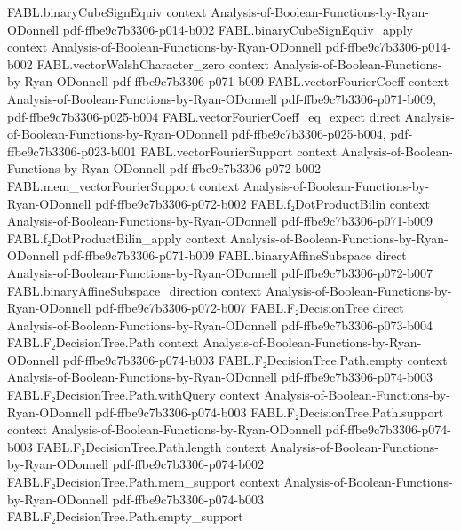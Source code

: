 \begin{theorem}
\proofstep
  {FABL.binaryCubeSignEquiv}
  {context}
  {Analysis-of-Boolean-Functions-by-Ryan-ODonnell}
  {pdf-ffbe9c7b3306-p014-b002}
\proofstep
  {FABL.binaryCubeSignEquiv_apply}
  {context}
  {Analysis-of-Boolean-Functions-by-Ryan-ODonnell}
  {pdf-ffbe9c7b3306-p014-b002}
\proofstep
  {FABL.vectorWalshCharacter_zero}
  {context}
  {Analysis-of-Boolean-Functions-by-Ryan-ODonnell}
  {pdf-ffbe9c7b3306-p071-b009}
\proofstep
  {FABL.vectorFourierCoeff}
  {context}
  {Analysis-of-Boolean-Functions-by-Ryan-ODonnell}
  {pdf-ffbe9c7b3306-p071-b009,
    pdf-ffbe9c7b3306-p025-b004}
\proofstep
  {FABL.vectorFourierCoeff_eq_expect}
  {direct}
  {Analysis-of-Boolean-Functions-by-Ryan-ODonnell}
  {pdf-ffbe9c7b3306-p025-b004,
    pdf-ffbe9c7b3306-p023-b001}
\proofstep
  {FABL.vectorFourierSupport}
  {context}
  {Analysis-of-Boolean-Functions-by-Ryan-ODonnell}
  {pdf-ffbe9c7b3306-p072-b002}
\proofstep
  {FABL.mem_vectorFourierSupport}
  {context}
  {Analysis-of-Boolean-Functions-by-Ryan-ODonnell}
  {pdf-ffbe9c7b3306-p072-b002}
\proofstep
  {FABL.f₂DotProductBilin}
  {context}
  {Analysis-of-Boolean-Functions-by-Ryan-ODonnell}
  {pdf-ffbe9c7b3306-p071-b009}
\proofstep
  {FABL.f₂DotProductBilin_apply}
  {context}
  {Analysis-of-Boolean-Functions-by-Ryan-ODonnell}
  {pdf-ffbe9c7b3306-p071-b009}
\proofstep
  {FABL.binaryAffineSubspace}
  {direct}
  {Analysis-of-Boolean-Functions-by-Ryan-ODonnell}
  {pdf-ffbe9c7b3306-p072-b007}
\proofstep
  {FABL.binaryAffineSubspace_direction}
  {context}
  {Analysis-of-Boolean-Functions-by-Ryan-ODonnell}
  {pdf-ffbe9c7b3306-p072-b007}
\proofstep
  {FABL.F₂DecisionTree}
  {direct}
  {Analysis-of-Boolean-Functions-by-Ryan-ODonnell}
  {pdf-ffbe9c7b3306-p073-b004}
\proofstep
  {FABL.F₂DecisionTree.Path}
  {context}
  {Analysis-of-Boolean-Functions-by-Ryan-ODonnell}
  {pdf-ffbe9c7b3306-p074-b003}
\proofstep
  {FABL.F₂DecisionTree.Path.empty}
  {context}
  {Analysis-of-Boolean-Functions-by-Ryan-ODonnell}
  {pdf-ffbe9c7b3306-p074-b003}
\proofstep
  {FABL.F₂DecisionTree.Path.withQuery}
  {context}
  {Analysis-of-Boolean-Functions-by-Ryan-ODonnell}
  {pdf-ffbe9c7b3306-p074-b003}
\proofstep
  {FABL.F₂DecisionTree.Path.support}
  {context}
  {Analysis-of-Boolean-Functions-by-Ryan-ODonnell}
  {pdf-ffbe9c7b3306-p074-b003}
\proofstep
  {FABL.F₂DecisionTree.Path.length}
  {context}
  {Analysis-of-Boolean-Functions-by-Ryan-ODonnell}
  {pdf-ffbe9c7b3306-p074-b002}
\proofstep
  {FABL.F₂DecisionTree.Path.mem_support}
  {context}
  {Analysis-of-Boolean-Functions-by-Ryan-ODonnell}
  {pdf-ffbe9c7b3306-p074-b003}
\proofstep
  {FABL.F₂DecisionTree.Path.empty_support}

\end{theorem}
